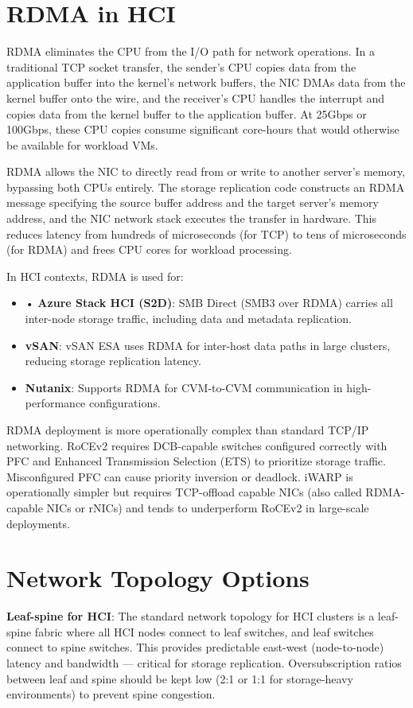 \section{RDMA in HCI}
RDMA eliminates the CPU from the I/O path for network operations. In a traditional TCP socket transfer, the sender's CPU copies data from the application buffer into the kernel's network buffers, the NIC DMAs data from the kernel buffer onto the wire, and the receiver's CPU handles the interrupt and copies data from the kernel buffer to the application buffer. At 25Gbps or 100Gbps, these CPU copies consume significant core-hours that would otherwise be available for workload VMs.

RDMA allows the NIC to directly read from or write to another server's memory, bypassing both CPUs entirely. The storage replication code constructs an RDMA message specifying the source buffer address and the target server's memory address, and the NIC network stack executes the transfer in hardware. This reduces latency from hundreds of microseconds (for TCP) to tens of microseconds (for RDMA) and frees CPU cores for workload processing.

In HCI contexts, RDMA is used for:

\begin{itemize}
  \item • \textbf{Azure Stack HCI (S2D)}: SMB Direct (SMB3 over RDMA) carries all inter-node storage traffic, including data and metadata replication.
  \item \textbf{vSAN}: vSAN ESA uses RDMA for inter-host data paths in large clusters, reducing storage replication latency.
  \item \textbf{Nutanix}: Supports RDMA for CVM-to-CVM communication in high-performance configurations.
\end{itemize}

RDMA deployment is more operationally complex than standard TCP/IP networking. RoCEv2 requires DCB-capable switches configured correctly with PFC and Enhanced Transmission Selection (ETS) to prioritize storage traffic. Misconfigured PFC can cause priority inversion or deadlock. iWARP is operationally simpler but requires TCP-offload capable NICs (also called RDMA-capable NICs or rNICs) and tends to underperform RoCEv2 in large-scale deployments.

\section{Network Topology Options}
\textbf{Leaf-spine for HCI}: The standard network topology for HCI clusters is a leaf-spine fabric where all HCI nodes connect to leaf switches, and leaf switches connect to spine switches. This provides predictable east-west (node-to-node) latency and bandwidth --- critical for storage replication. Oversubscription ratios between leaf and spine should be kept low (2:1 or 1:1 for storage-heavy environments) to prevent spine congestion.

